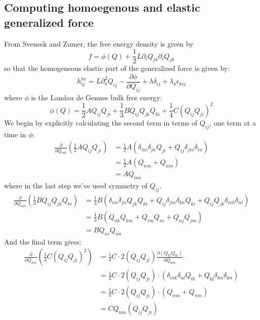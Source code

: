 \documentclass[reqno]{article}
\begin{document}
	\subsection{Computing homoegenous and elastic generalized force}
	From Svensek and Zumer, the free energy density is given by
	\begin{equation}
		f = \phi(Q) + \frac{1}{2} L \partial_i Q_{jk} \partial_i Q_{jk}
	\end{equation}
	so that the homogeneous elastic part of the generalized force is given by:
	\begin{equation}
		h^{he}_{ij} = L\partial_k^2 Q_{ij} - \frac{\partial \phi}{\partial Q_{ij}} + \lambda \delta_{ij} + \lambda_k\epsilon_{kij}
	\end{equation}
	where $\phi$ is the Landau de Gennes bulk free energy:
	\begin{equation} \label{eq:LdG}
		\phi(Q) = \frac{1}{2}A Q_{ij}Q_{ji} + \frac{1}{3}B Q_{ij}Q_{jk}Q_{ki} + \frac{1}{4} C(Q_{ij}Q_{ji})^2
	\end{equation}
	We begin by explicitly calculating the second term in terms of $Q_{ij}$, one term at a time in $\phi$:
	\begin{equation}
	\begin{split}
		\frac{\partial}{\partial Q_{mn}}\left(\frac{1}{2}AQ_{ij}Q_{ji}\right) &= \frac{1}{2}A \left(\delta_{im}\delta_{jn}Q_{ji} + Q_{ij}\delta_{jm}\delta_{in}\right) \\
		&= \frac{1}{2}A (Q_{nm} + Q_{nm}) \\
		&= A Q_{mn}
	\end{split}
	\end{equation}
	where in the last step we've used symmetry of $Q_{ij}$.
	\begin{equation}
	\begin{split}
		\frac{\partial}{\partial Q_{mn}} \left( \frac{1}{3}BQ_{ij}Q_{jk}Q_{ki} \right) &= \frac{1}{3}B ( \delta_{im}\delta_{jn}Q_{jk}Q_{ki} + Q_{ij}\delta_{jm}\delta_{kn}Q_{ki} + Q_{ij}Q_{jk}\delta_{mk}\delta_{ni} ) \\
		&= \frac{1}{3}B(Q_{nk}Q_{km} + Q_{im}Q_{ni} + Q_{nj}Q_{jm}) \\
		&= BQ_{ni}Q_{im}
	\end{split}
	\end{equation}
	And the final term gives:
	\begin{equation}
	\begin{split}
		\frac{\partial}{\partial Q_{mn}}\left( \frac{1}{4} C(Q_{ij}Q_{ji})^2 \right) &= \frac{1}{4}C \cdot 2(Q_{ij}Q_{ji}) \frac{\partial(Q_{kl}Q_{lk})}{\partial Q_{mn}} \\
		&= \frac{1}{4}C \cdot 2(Q_{ij}Q_{ji}) \cdot (\delta_{mk}\delta_{nl}Q_{lk} + Q_{kl}\delta_{lm}\delta_{kn}) \\
		&= \frac{1}{4}C \cdot 2(Q_{ij}Q_{ji}) \cdot (Q_{nm} + Q_{nm}) \\
		&= C Q_{mn} (Q_{ij}Q_{ji})
	\end{split}
	\end{equation}
\end{document}
